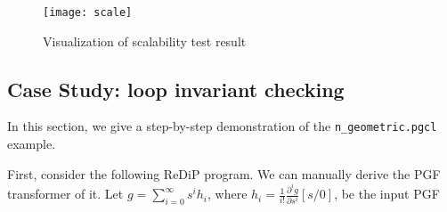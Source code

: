 \documentclass[a4paper]{article}
\begin{document}
\begin{figure}
	\begin{center}
		\texttt{[image: scale]}
	\end{center}
	\caption{Visualization of scalability test result}\label{fig:test2}
\end{figure}

\subsection{Case Study: loop invariant checking}

In this section, we give a step-by-step demonstration of the \texttt{n\_geometric.pgcl} example.\par
First, consider the following ReDiP program. We can manually derive the PGF transformer of it.
Let \( g  = \sum_{i=0}^\infty s^i h_i \), where \(h_i = \frac{1}{i!}\frac{\partial^i g}{\partial s^i}[s/0]\), be the input PGF
\end{document}
